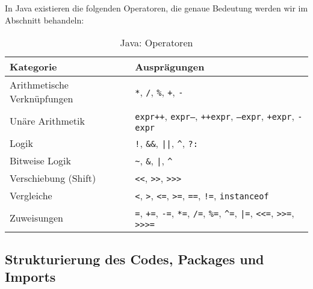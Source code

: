 	In Java existieren die folgenden Operatoren, die genaue Bedeutung werden wir im Abschnitt  behandeln:
	\begin{table}[H]
		\centering
		\begin{tabular}{l | l}
			Kategorie & Ausprägungen \\
			\hline
			Arithmetische Verknüpfungen & \texttt{*}, \texttt{/}, \texttt{\%}, \texttt{+}, \texttt{-} \\
			Unäre Arithmetik            & \texttt{expr++}, \texttt{expr--}, \texttt{++expr}, \texttt{--expr}, \texttt{+expr}, \texttt{-expr} \\
			Logik                       & \texttt{!}, \texttt{\&\&}, \texttt{||}, \texttt{\textasciicircum}, \texttt{?:} \\
			Bitweise Logik              & \texttt{\textasciitilde}, \texttt{\&}, \texttt{|}, \texttt{\textasciicircum} \\
			Verschiebung (Shift)        & \texttt{<{}<}, \texttt{>{}>}, \texttt{>{}>{}>} \\
			Vergleiche                  & \texttt{<}, \texttt{>}, \texttt{<=}, \texttt{>=}, \texttt{==}, \texttt{!=}, \texttt{instanceof} \\
			Zuweisungen                 & \texttt{=}, \texttt{+=}, \texttt{-=}, \texttt{*=}, \texttt{/=}, \texttt{\%=}, \texttt{\textasciicircum=}, \texttt{|=}, \texttt{<{}<=}, \texttt{>{}>=}, \texttt{>{}>{}>=} \\
		\end{tabular}
		\caption{Java: Operatoren}
	\end{table}
	

\subsection{Strukturierung des Codes, Packages und Imports}
	
	
